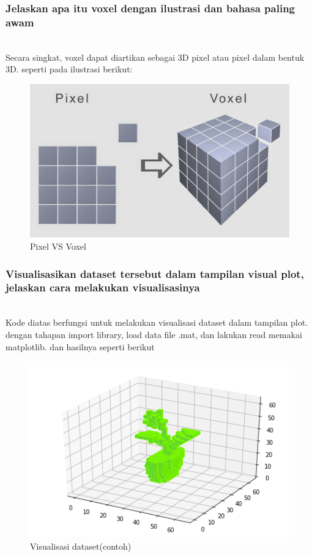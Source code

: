 \subsubsection{Jelaskan apa itu voxel dengan ilustrasi dan bahasa paling awam}
\hfill\\
Secara singkat, voxel dapat diartikan sebagai 3D pixel atau pixel dalam bentuk 3D. seperti pada ilustrasi berikut:
\begin{figure}[H]
	\centering
	\includegraphics[width=12cm]{figures/1174083/figures8/p7.png}
	\caption{Pixel VS Voxel}
\end{figure}


\subsubsection{Visualisasikan dataset tersebut dalam tampilan visual plot, jelaskan cara melakukan visualisasinya}
\hfill\\

Kode diatas berfungsi untuk melakukan visualisasi dataset dalam tampilan plot. dengan tahapan import library, load data file .mat, dan lakukan read memakai matplotlib. dan hasilnya seperti berikut
\begin{figure}[H]
	\centering
	\includegraphics[scale=0.5]{figures/1174083/figures8/flower_pot.png}
	\caption{Visualisasi dataset(contoh)}
\end{figure}


